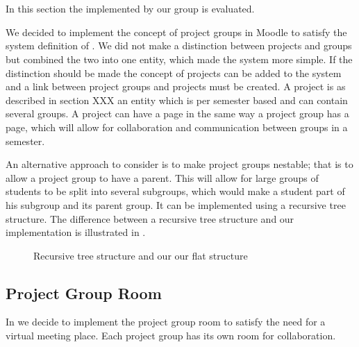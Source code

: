 \section{\administrationgroup{}}
In this section the \subsystem{} implemented by our group is evaluated. 

We decided to implement the concept of project groups in Moodle to satisfy the system definition of \system{}.
We did not make a distinction between projects and groups but combined the two into one entity, which made the system more simple. 
If the distinction should be made the concept of projects can be added to the system and a link between project groups and projects must be created.
A project is as described in section XXX an entity which is per semester based and can contain several groups. %
A project can have a page in the same way a project group has a page, which will allow for collaboration and communication between groups in a semester. 

An alternative approach to consider is to make project groups nestable; that is to allow a project group to have a parent.
This will allow for large groups of students to be split into several subgroups, which would make a student part of his subgroup and its parent group.
It can be implemented using a recursive tree structure.
The difference between a recursive tree structure and our implementation is illustrated in .

\begin{figure}%
\caption{Recursive tree structure and our our flat structure}%
\label{fig:recursivetree}%
\end{figure}



\subsection{Project Group Room}
In  we decide to implement the project group room to satisfy the need for a virtual meeting place.
Each project group has its own room for collaboration. 

